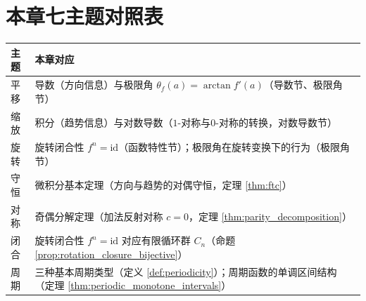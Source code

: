 \section*{本章七主题对照表}

\begin{center}
\begin{tabular}{>{\centering\arraybackslash}p{2.2cm}>{\centering\arraybackslash}p{10.5cm}}
\toprule
主题 & 本章对应 \\
\midrule
平移 & 导数（方向信息）与极限角 $\theta_f(a)=\arctan f'(a)$（导数节、极限角节） \\
缩放 & 积分（趋势信息）与对数导数（$1$-对称与$0$-对称的转换，对数导数节） \\
旋转 & 旋转闭合性 $f^n=\text{id}$（函数特性节）；极限角在旋转变换下的行为（极限角节） \\
守恒 & 微积分基本定理（方向与趋势的对偶守恒，定理 \ref{thm:ftc}） \\
对称 & 奇偶分解定理（加法反射对称 $c=0$，定理 \ref{thm:parity_decomposition}） \\
闭合 & 旋转闭合性 $f^n=\text{id}$ 对应有限循环群 $C_n$（命题 \ref{prop:rotation_closure_bijective}） \\
周期 & 三种基本周期类型（定义 \ref{def:periodicity}）；周期函数的单调区间结构（定理 \ref{thm:periodic_monotone_intervals}） \\
\bottomrule
\end{tabular}
\end{center}

